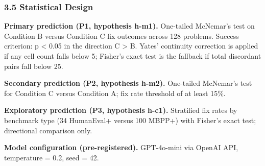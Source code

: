 \subsubsection{3.5 Statistical Design}

\textbf{Primary prediction (P1, hypothesis h-m1).} One-tailed McNemar's test on Condition B versus Condition C fix outcomes across 128 problems. Success criterion: p < 0.05 in the direction C > B. Yates' continuity correction is applied if any cell count falls below 5; Fisher's exact test is the fallback if total discordant pairs fall below 25.

\textbf{Secondary prediction (P2, hypothesis h-m2).} One-tailed McNemar's test for Condition C versus Condition A; fix rate threshold of at least 15\%.

\textbf{Exploratory prediction (P3, hypothesis h-c1).} Stratified fix rates by benchmark type (34 HumanEval+ versus 100 MBPP+) with Fisher's exact test; directional comparison only.

\textbf{Model configuration (pre-registered).} GPT-4o-mini via OpenAI API, temperature = 0.2, seed = 42.

